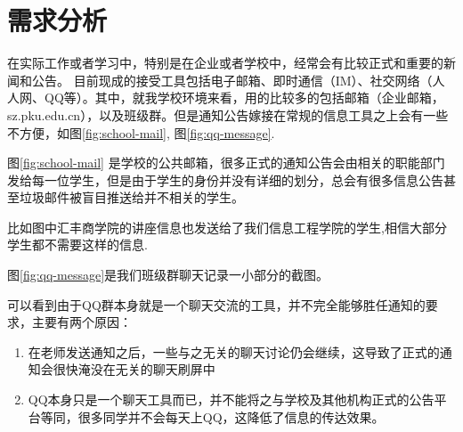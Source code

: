 \documentclass[a4paper]{ctexart}
\begin{document}
\section{需求分析}
\par 在实际工作或者学习中，特别是在企业或者学校中，经常会有比较正式和重要的新闻和公告。 目前现成的接受工具包括电子邮箱、即时通信（IM）、社交网络（人人网、QQ等）。其中，就我学校环境来看，用的比较多的包括邮箱（企业邮箱，sz.pku.edu.cn），以及班级群。但是通知公告嫁接在常规的信息工具之上会有一些不方便，如图\ref{fig:school-mail}, 图\ref{fig:qq-message}.
    \par 图\ref{fig:school-mail} 是学校的公共邮箱，很多正式的通知公告会由相关的职能部门发给每一位学生，但是由于学生的身份并没有详细的划分，总会有很多信息公告甚至垃圾邮件被盲目推送给并不相关的学生。
    \par 比如图中汇丰商学院的讲座信息也发送给了我们信息工程学院的学生,相信大部分学生都不需要这样的信息.
    \par 图\ref{fig:qq-message}是我们班级群聊天记录一小部分的截图。
    \par 可以看到由于QQ群本身就是一个聊天交流的工具，并不完全能够胜任通知的要求，主要有两个原因：
    \begin{enumerate}
        \item 在老师发送通知之后，一些与之无关的聊天讨论仍会继续，这导致了正式的通知会很快淹没在无关的聊天刷屏中
        \item QQ本身只是一个聊天工具而已，并不能将之与学校及其他机构正式的公告平台等同，很多同学并不会每天上QQ，这降低了信息的传达效果。
    \end{enumerate}
\end{document}
